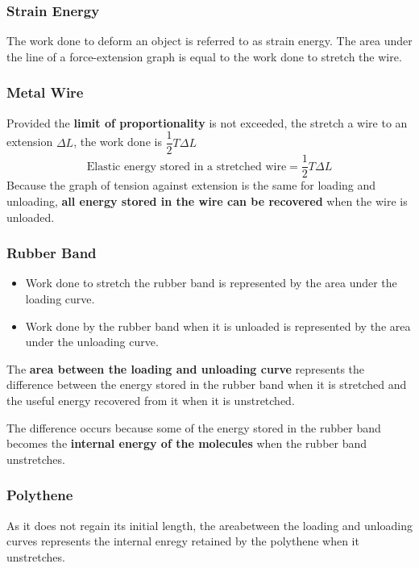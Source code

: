 \subsubsection*{Strain Energy}

The work done to deform an object is referred to as strain energy. The area under the line of a force-extension graph is equal to the work done to stretch the wire.

\subsubsection*{Metal Wire}

Provided the \textbf{limit of proportionality} is not exceeded, the stretch a wire to an extension $\Delta L$, the work done is $\dfrac{1}{2}T\Delta L$
$$\text{Elastic energy stored in a stretched wire}=\frac{1}{2}T\Delta L$$
Because the graph of tension against extension is the same for loading and unloading, \textbf{all energy stored in the wire can be recovered} when the wire is unloaded.

\subsubsection*{Rubber Band}

\begin{itemize}
    \item Work done to stretch the rubber band is represented by the area under the loading curve.
    \item Work done by the rubber band when it is unloaded is represented by the area under the unloading curve.
\end{itemize}

The \textbf{area between the loading and unloading curve} represents the difference between the energy stored in the rubber band when it is stretched and the useful energy recovered from it when it is unstretched. 

The difference occurs because some of the energy stored in the rubber band becomes the \textbf{internal energy of the molecules} when the rubber band unstretches.

\subsubsection*{Polythene}

As it does not regain its initial length, the areabetween the loading and unloading curves represents the internal enregy retained by the polythene when it unstretches.
